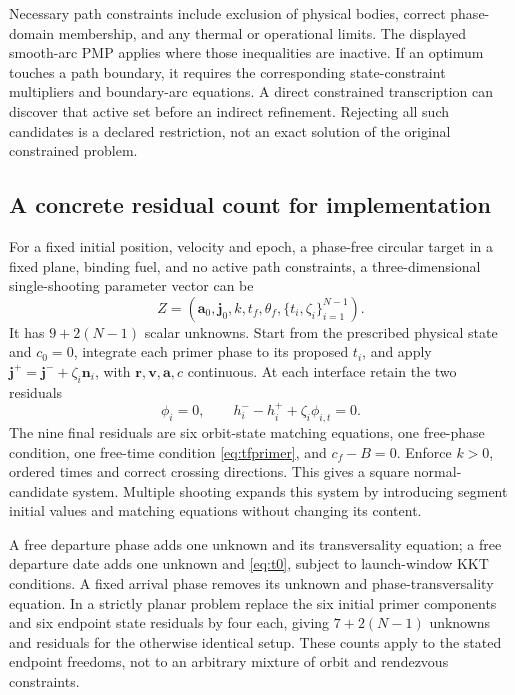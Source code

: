 \documentclass[journal, a4paper]{IEEEtran}
\begin{document}
Necessary path constraints include exclusion of physical bodies, correct phase-domain membership, and any thermal or operational limits. The displayed smooth-arc PMP applies where those inequalities are inactive. If an optimum touches a path boundary, it requires the corresponding state-constraint multipliers and boundary-arc equations. A direct constrained transcription can discover that active set before an indirect refinement. Rejecting all such candidates is a declared restriction, not an exact solution of the original constrained problem.

\subsection{A concrete residual count for implementation}
For a fixed initial position, velocity and epoch, a phase-free circular target in a fixed plane, binding fuel, and no active path constraints, a three-dimensional single-shooting parameter vector can be
\begin{equation}
 Z=(\mathbf a_0,\mathbf j_0,k,t_f,\theta_f,
             \{t_i,\zeta_i\}_{i=1}^{N-1}).
\end{equation}
It has $9+2(N-1)$ scalar unknowns. Start from the prescribed physical state and $c_0=0$, integrate each primer phase to its proposed $t_i$, and apply $\mathbf j^+=\mathbf j^-+\zeta_i\mathbf n_i$, with $\mathbf r,\mathbf v,\mathbf a,c$ continuous. At each interface retain the two residuals
\begin{equation}
 \phi_i=0,\qquad h_i^- -h_i^+ +\zeta_i\phi_{i,t}=0.
\end{equation}
The nine final residuals are six orbit-state matching equations, one free-phase condition, one free-time condition \eqref{eq:tfprimer}, and $c_f-B=0$. Enforce $k>0$, ordered times and correct crossing directions. This gives a square normal-candidate system. Multiple shooting expands this system by introducing segment initial values and matching equations without changing its content.

A free departure phase adds one unknown and its transversality equation; a free departure date adds one unknown and \eqref{eq:t0}, subject to launch-window KKT conditions. A fixed arrival phase removes its unknown and phase-transversality equation. In a strictly planar problem replace the six initial primer components and six endpoint state residuals by four each, giving $7+2(N-1)$ unknowns and residuals for the otherwise identical setup. These counts apply to the stated endpoint freedoms, not to an arbitrary mixture of orbit and rendezvous constraints.
\end{document}
